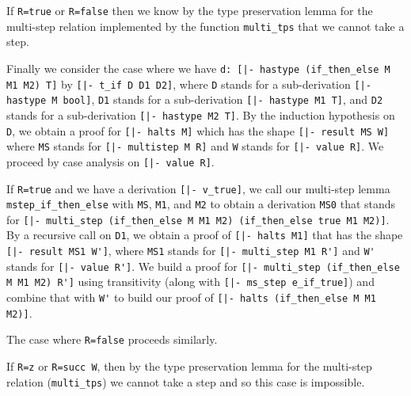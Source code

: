 If \lstinline!R=true! or \lstinline!R=false! then we know by the type
preservation lemma for the multi-step relation implemented by the
function \lstinline!multi_tps! that we cannot take a step.

Finally we consider the case where we have
\lstinline!d: [|- hastype (if_then_else M M1 M2) T]! by
\lstinline![|- t_if D D1 D2]!, where
\lstinline!D! stands for a sub-derivation \lstinline![|- hastype M bool]!,
\lstinline!D1! stands for a sub-derivation \lstinline![|- hastype M1 T]!, and
\lstinline!D2! stands for a sub-derivation \lstinline![|- hastype M2 T]!. By the
induction hypothesis on \lstinline!D!, we obtain a proof for \lstinline![|- halts M]!
which has the shape \lstinline![|- result MS W]! where \lstinline!MS! stands for
\lstinline![|- multistep M R]! and \lstinline!W! stands for \lstinline![|- value R]!.
We proceed by case analysis on \lstinline![|- value R]!.

If \lstinline!R=true! and we have a derivation \lstinline![|- v_true]!, we call
our multi-step lemma \lstinline!mstep_if_then_else! with \lstinline!MS!, \lstinline!M1!, and
\lstinline!M2! to obtain a derivation \lstinline!MS0! that stands for
\lstinline![|- multi_step (if_then_else M M1 M2) (if_then_else true M1 M2)]!. By a recursive
call on \lstinline!D1!, we obtain a proof of \lstinline![|- halts M1]! that has the shape
\lstinline![|- result MS1 W']!, where \lstinline!MS1! stands for
\lstinline![|- multi_step M1 R']! and \lstinline!W'! stands for \lstinline![|- value R']!.
We build a proof for \lstinline![|- multi_step (if_then_else M M1 M2) R']! using
transitivity (along with \lstinline![|- ms_step e_if_true]!)
and combine that with \lstinline!W'! to build our proof of
\lstinline![|- halts (if_then_else M M1 M2)]!.

The case where \lstinline!R=false! proceeds similarly.

If \lstinline!R=z! or \lstinline!R=succ W!, then by the type preservation
lemma for the multi-step relation (\lstinline!multi_tps!) we cannot take a step
and so this case is impossible.


